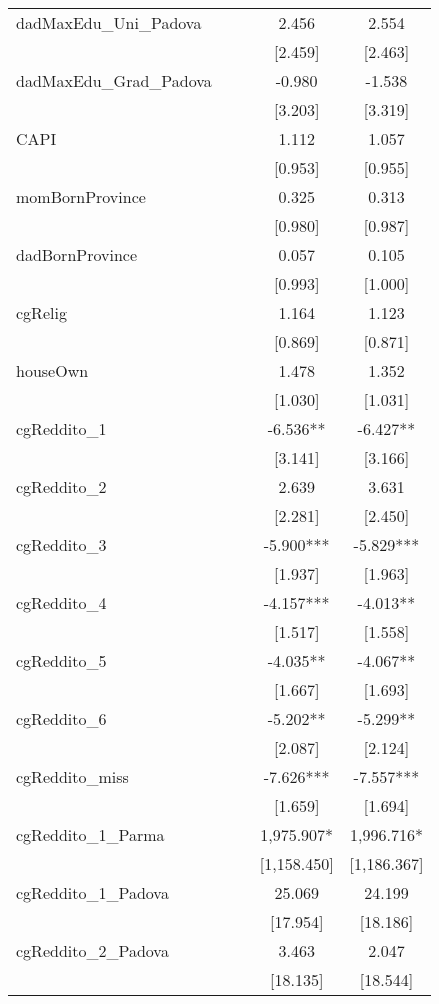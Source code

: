\documentclass[]{article}
\begin{document}
\begin{tabular}{lcccc}
dadMaxEdu\_Uni\_Padova &  &  & 2.456 & 2.554 \\
 &  &  & [2.459] & [2.463] \\
dadMaxEdu\_Grad\_Padova &  &  & -0.980 & -1.538 \\
 &  &  & [3.203] & [3.319] \\
CAPI &  &  & 1.112 & 1.057 \\
 &  &  & [0.953] & [0.955] \\
momBornProvince &  &  & 0.325 & 0.313 \\
 &  &  & [0.980] & [0.987] \\
dadBornProvince &  &  & 0.057 & 0.105 \\
 &  &  & [0.993] & [1.000] \\
cgRelig &  &  & 1.164 & 1.123 \\
 &  &  & [0.869] & [0.871] \\
houseOwn &  &  & 1.478 & 1.352 \\
 &  &  & [1.030] & [1.031] \\
cgReddito\_1 &  &  & -6.536** & -6.427** \\
 &  &  & [3.141] & [3.166] \\
cgReddito\_2 &  &  & 2.639 & 3.631 \\
 &  &  & [2.281] & [2.450] \\
cgReddito\_3 &  &  & -5.900*** & -5.829*** \\
 &  &  & [1.937] & [1.963] \\
cgReddito\_4 &  &  & -4.157*** & -4.013** \\
 &  &  & [1.517] & [1.558] \\
cgReddito\_5 &  &  & -4.035** & -4.067** \\
 &  &  & [1.667] & [1.693] \\
cgReddito\_6 &  &  & -5.202** & -5.299** \\
 &  &  & [2.087] & [2.124] \\
cgReddito\_miss &  &  & -7.626*** & -7.557*** \\
 &  &  & [1.659] & [1.694] \\
cgReddito\_1\_Parma &  &  & 1,975.907* & 1,996.716* \\
 &  &  & [1,158.450] & [1,186.367] \\
cgReddito\_1\_Padova &  &  & 25.069 & 24.199 \\
 &  &  & [17.954] & [18.186] \\
cgReddito\_2\_Padova &  &  & 3.463 & 2.047 \\
 &  &  & [18.135] & [18.544] \\

\end{tabular}
\end{document}
